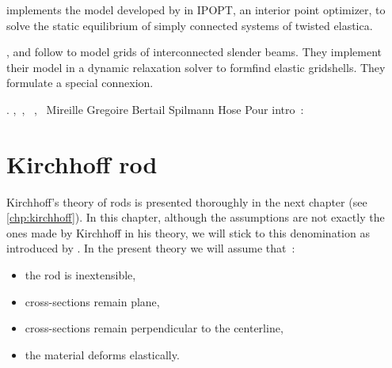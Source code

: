  implements the model developed by \cite{Bergou2008} in IPOPT, an interior point optimizer, to solve the static equilibrium of simply connected systems of twisted elastica.

,  and  follow \cite{Bergou2008} to model grids of interconnected slender beams. They implement their model in a dynamic relaxation solver to formfind elastic gridshells. They formulate a special connexion.

\cite{Spillmann2007}.
\cite{Fuller1978},~\cite{deVries2005}, ~\cite{Vauquelin2000},~\cite{Berger2009}
Mireille Gregoire
Bertail
Spilmann
Hose
Pour intro~:~\cite{Jung2010}




\section{Kirchhoff rod}\label{sec:kirchhoff_rod}
Kirchhoff's theory of rods is presented thoroughly in the next chapter (see \cref{chp:kirchhoff}). In this chapter, although the assumptions are not exactly the ones made by  Kirchhoff in his theory, we will stick to this denomination as introduced by \cite{Bergou2008}. In the present theory we will assume that~:
\begin{itemize}
\item the rod is inextensible,
\item cross-sections remain plane,
\item cross-sections remain perpendicular to the centerline,
\item the material deforms elastically.
\end{itemize}

